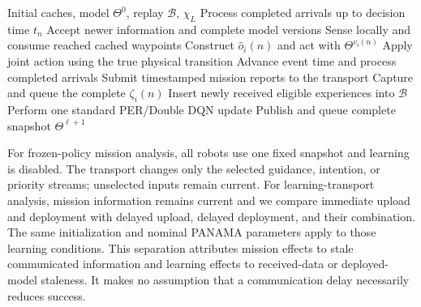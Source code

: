 \begin{panamaaddition}
\begin{algorithm}[t]
\color{panamaaddition}
\caption{PANAMA with timestamped information and learning transport}
\label{alg:panama-delay}
\begin{algorithmic}[1]
\Require Initial caches, model $\Theta^0$, replay $\mathcal{B}$, $\chi_L$
  \State Process completed arrivals up to decision time $t_n$
  \State Accept newer information and complete model versions
    \State Sense locally and consume reached cached waypoints
    \State Construct $\widehat{o}_i(n)$ and act with $\Theta^{v_i(n)}$
  \EndFor
  \State Apply joint action using the true physical transition
  \State Advance event time and process completed arrivals
    \State Submit timestamped mission reports to the transport
    \State Capture and queue the complete $\zeta_i(n)$
  \EndFor
  \State Insert newly received eligible experiences into $\mathcal{B}$
    \State Perform one standard PER/Double DQN update
  \EndIf
    \State Publish and queue complete snapshot $\Theta^{\ell+1}$
  \EndIf
\EndFor
\end{algorithmic}
\end{algorithm}

For frozen-policy mission analysis, all robots use one fixed snapshot and
learning is disabled. The transport changes only the selected guidance,
intention, or priority streams; unselected inputs remain current. For
learning-transport analysis, mission information remains current and we
compare immediate upload and deployment with delayed upload, delayed
deployment, and their combination. The same initialization and nominal PANAMA
parameters apply to those learning conditions. This separation attributes
mission effects to stale communicated information and learning effects to
received-data or deployed-model staleness. It makes no assumption that a
communication delay necessarily reduces success.
\end{panamaaddition}
